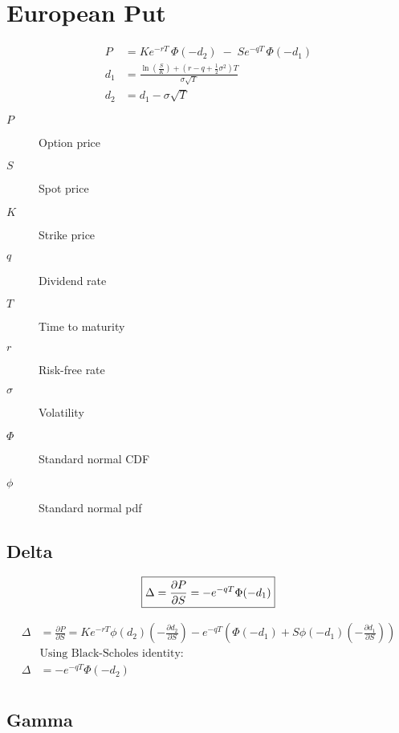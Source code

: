 \documentclass[12pt,a4paper]{article}
\begin{document}
\newpage

\section{European Put}

\[
  \begin{aligned}
    P   & = K e^{-rT}\,\Phi(-d_2) \;-\; S e^{-qT}\,\Phi(-d_1) \\
    d_1 & = \frac{\ln\!\left(\tfrac{S}{K}\right) + (r - q + \tfrac{1}{2}\sigma^2)T}{\sigma \sqrt{T}} \\
    d_2 & = d_1 - \sigma \sqrt{T}
  \end{aligned}
\]

\begin{description}
  \item[$P$] Option price
  \item[$S$] Spot price
  \item[$K$] Strike price
  \item[$q$] Dividend rate
  \item[$T$] Time to maturity
  \item[$r$] Risk-free rate
  \item[$\sigma$] Volatility
  \item[$\Phi$] Standard normal CDF
  \item[$\phi$] Standard normal pdf
\end{description}

\subsection{Delta}

\[
  \boxed{\Delta = \frac{\partial P}{\partial S} = -e^{-qT}\Phi(-d_1)} \\
\]

\[
  \begin{aligned}
    \Delta & = \frac{\partial P}{\partial S} = Ke^{-rT}\phi(d_2)\left(-\frac{\partial d_2}{\partial S}\right) - e^{-qT}\left(\Phi(-d_1) + S\phi(-d_1)\left(-\frac{\partial d_1}{\partial S}\right)\right) \\
    &\text{Using Black-Scholes identity:} \\
    \Delta & = -e^{-qT}\Phi(-d_2) \\
  \end{aligned}
\]

\subsection{Gamma}
\end{document}
